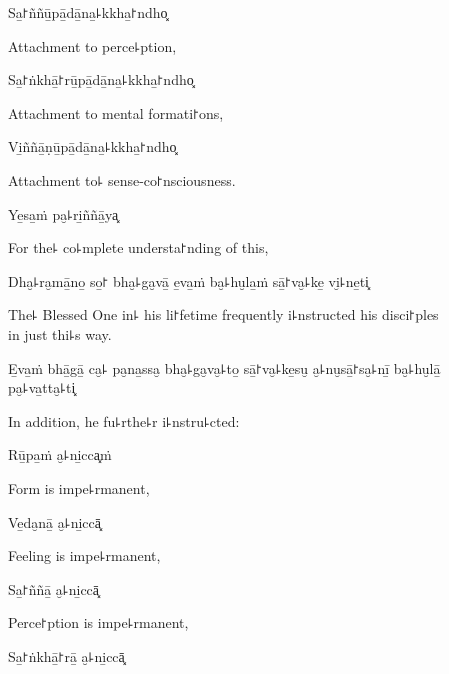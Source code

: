 Sa̱꜓ññū̱pā̱dā̱na̱꜕kkha̱꜓ndho͓

\begin{english}
  Attachment to perce꜕ption,
\end{english}

Sa̱꜓ṅkhā̱꜓rū̱pā̱dā̱na̱꜕kkha̱꜓ndho͓

\begin{english}
  Attachment to mental formati꜓ons,
\end{english}

Vi̱ññā̱ṇū̱pā̱dā̱na̱꜕kkha̱꜓ndho͓

\begin{english}
  Attachment to꜕ sense-co꜓nsciousness.
\end{english}

Ye̱sa̱ṁ pa̮꜕ri̱ññā̱ya͓

\begin{english}
  For the꜕ co꜕mplete understa꜓nding of this,
\end{english}

Dha̮꜕ra̮mā̱no̱ so̱꜓ bha̮꜕ga̮vā̱ e̱va̱ṁ ba̮꜕hu̮la̱ṁ sā̱꜓va̮꜕ke̱ vi̮꜕ne̱ti͓

\begin{english}
  The꜕ Blessed One in꜕ his li꜓fetime frequently i꜕nstructed his disci꜓ples \\in just thi꜕s way.
\end{english}

E̱va̱ṁ bhā̱gā̱ ca̮꜕ pa̮na̱ssa̮ bha̮꜕ga̮va̮꜕to̱ sā̱꜓va̮꜕ke̱su̮ a̮꜕nu̮sā̱꜓sa̮꜕nī̱ ba̮꜕hu̮lā̱ pa̮꜕va̱tta̮꜕ti͓

\begin{english}
  In addition, he fu꜕rthe꜕r i꜕nstru꜕cted:
\end{english}


Rū̱pa̱ṁ a̮꜕ni̱cca͓ṁ

\begin{english}
  Form is impe꜕rmanent,
\end{english}

Ve̱da̮nā̱ a̮꜕ni̱ccā͓

\begin{english}
  Feeling is impe꜕rmanent,
\end{english}

Sa̱꜓ññā̱ a̮꜕ni̱ccā͓

\begin{english}
  Perce꜓ption is impe꜕rmanent,
\end{english}

Sa̱꜓ṅkhā̱꜓rā̱ a̮꜕ni̱ccā͓

